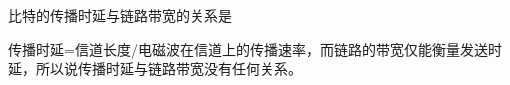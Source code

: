 \question 比特的传播时延与链路带宽的关系是
\par{}
\begin{solution}传播时延=信道长度/电磁波在信道上的传播速率，而链路的带宽仅能衡量发送时延，所以说传播时延与链路带宽没有任何关系。
\end{solution}
